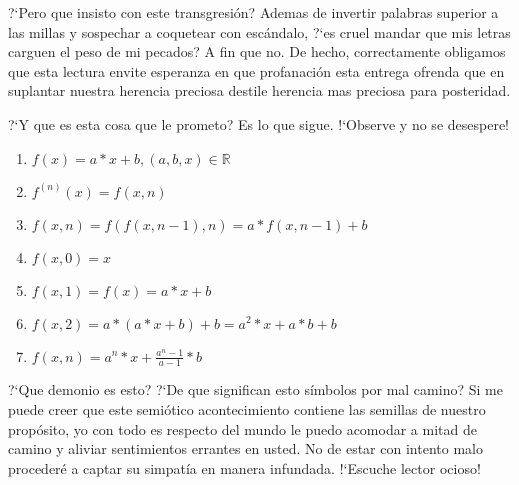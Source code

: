 \documentclass[12pt]{article}
\begin{document}
\begin{multicols*}{2}
		\mbox{?`}Pero que insisto con este transgresi\'{o}n? Ademas de invertir palabras superior a las millas y sospechar a coquetear con esc\'{a}ndalo, \mbox{?`}es cruel mandar que mis letras carguen el peso de mi pecados? A fin que no. De hecho, correctamente obligamos que esta lectura envite esperanza en que profanación esta entrega ofrenda que en suplantar nuestra herencia preciosa destile herencia mas preciosa para posteridad.
		
		\mbox{?`}Y que es esta cosa que le prometo? Es lo que sigue. \mbox{!`}Observe y no se desespere!
		
		\begin{enumerate}
			\item $f(x)=a*x+b, (a,b,x)\in\mathbb{R}$
			\item $f^{(n)}(x)=f(x,n)$
			\item $f(x,n)=f(f(x,n-1),n)=a*f(x,n-1)+b$
			\item $f(x,0)=x$
			\item $f(x,1)=f(x)=a*x+b$
			\item $f(x,2)=a*(a*x+b)+b=a^{2}*x+a*b+b$
			\item $f(x,n)=a^{n}*x+\frac{a^{n}-1}{a-1}*b$
		\end{enumerate}
	
		\mbox{?`}Que demonio es esto? \mbox{?`}De que significan esto s\'{i}mbolos por mal camino? Si me puede creer que este semi\'{o}tico acontecimiento contiene las semillas de nuestro prop\'{o}sito, yo con todo es respecto del mundo le puedo acomodar a mitad de camino y aliviar sentimientos errantes en usted. No de estar con intento malo proceder\'{e} a captar su simpat\'{i}a en manera infundada. \mbox{!`}Escuche lector ocioso!
	\end{multicols*}
	
	
	
\end{document}

